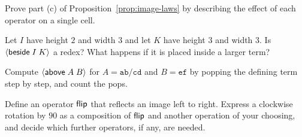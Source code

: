 \begin{exercise}[\dag]\label{ex:ch7-commute}
Prove part (c) of Proposition~\ref{prop:image-laws} by describing the effect of each operator on a single cell.
\end{exercise}

\begin{exercise}[\dag]\label{ex:ch7-beside}
Let $I$ have height $2$ and width $3$ and let $K$ have height $3$ and width $3$. Is $\langle \mathsf{beside}\; I\; K\rangle$ a redex? What happens if it is placed inside a larger term?
\end{exercise}

\begin{exercise}[\dag]\label{ex:ch7-above}
Compute $\langle \mathsf{above}\; A\; B\rangle$ for $A=\mathtt{ab/cd}$ and $B=\mathtt{ef}$ by popping the defining term step by step, and count the pops.
\end{exercise}

\begin{exercise}
Define an operator $\mathsf{flip}$ that reflects an image left to right. Express a clockwise rotation by $90$ as a composition of $\mathsf{flip}$ and another operation of your choosing, and decide which further operators, if any, are needed.
\end{exercise}
